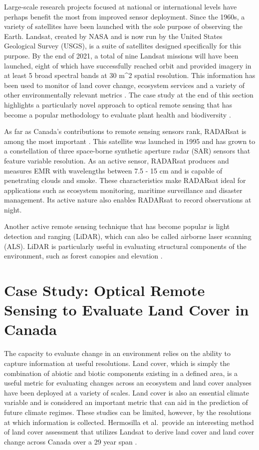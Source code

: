\documentclass[
]{book}
\begin{document}
Large-scale research projects focused at national or international levels have perhaps benefit the most from improved sensor deployment. Since the 1960s, a variety of satellites have been launched with the sole purpose of observing the Earth. Landsat, created by NASA and is now run by the United States Geological Survey (USGS), is a suite of satellites designed specifically for this purpose. By the end of 2021, a total of nine Landsat missions will have been launched, eight of which have successfully reached orbit and provided imagery in at least 5 broad spectral bands at 30 m\^{}2 spatial resolution. This information has been used to monitor of land cover change, ecosystem services and a variety of other environmentally relevant metrics \citep{deel_relationship_2012}. The case study at the end of this section highlights a particularly novel approach to optical remote sensing that has become a popular methodology to evaluate plant health and biodiversity \citep{ustin_imaging_2009, wang_spatial_2018}.

As far as Canada's contributions to remote sensing sensors rank, RADARsat is among the most important \citep{raney_radarsat_1991}. This satellite was launched in 1995 and has grown to a constellation of three space-borne synthetic aperture radar (SAR) sensors that feature variable resolution. As an active sensor, RADARsat produces and measures EMR with wavelengths between 7.5 - 15 cm and is capable of penetrating clouds and smoke. These characteristics make RADARsat ideal for applications such as ecosystem monitoring, maritime surveillance and disaster management. Its active nature also enables RADARsat to record observations at night.

Another active remote sensing technique that has become popular is light detection and ranging (LiDAR), which can also be called airborne laser scanning (ALS). LiDAR is particularly useful in evaluating structural components of the environment, such as forest canopies and elevation \citep{coops_estimating_2007}.

\section{Case Study: Optical Remote Sensing to Evaluate Land Cover in Canada}\label{case-study-optical-remote-sensing-to-evaluate-land-cover-in-canada}

The capacity to evaluate change in an environment relies on the ability to capture information at useful resolutions. Land cover, which is simply the combination of abiotic and biotic components existing in a defined area, is a useful metric for evaluating changes across an ecosystem and land cover analyses have been deployed at a variety of scales. Land cover is also an essential climate variable and is considered an important metric that can aid in the prediction of future climate regimes. These studies can be limited, however, by the resolutions at which information is collected. Hermosilla et al.~provide an interesting method of land cover assessment that utilizes Landsat to derive land cover and land cover change across Canada over a 29 year span \citep{hermosilla_disturbance-informed_2018}.
\end{document}
